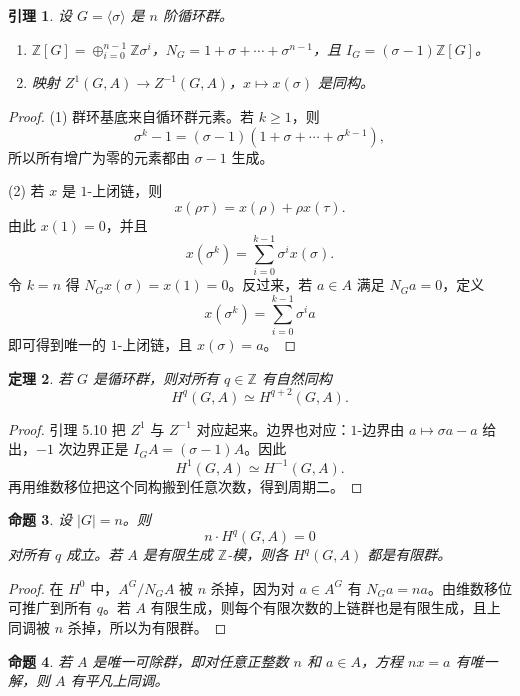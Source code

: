 \documentclass[11pt,a4paper,openany]{ctexbook}
\numberwithin{equation}{chapter}
\newcommand{\Z}{\mathbb{Z}}
\theoremstyle{plain}
\newtheorem{theorem}{定理}[chapter]
\newtheorem{proposition}[theorem]{命题}
\newtheorem{lemma}[theorem]{引理}
\theoremstyle{definition}
\theoremstyle{remark}
\begin{document}
\begin{lemma}
设 $G=\langle\sigma\rangle$ 是 $n$ 阶循环群。
\begin{enumerate}[label=(\arabic*)]
\item $\Z[G]=\oplus_{i=0}^{n-1}\Z\sigma^i$，$N_G=1+\sigma+\cdots+\sigma^{n-1}$，且 $I_G=(\sigma-1)\Z[G]$。
\item 映射 $Z^1(G,A)\to Z^{-1}(G,A)$，$x\mapsto x(\sigma)$ 是同构。
\end{enumerate}
\end{lemma}

\begin{proof}
(1) 群环基底来自循环群元素。若 $k\ge1$，则
\[
 \sigma^k-1=(\sigma-1)(1+\sigma+\cdots+\sigma^{k-1}),
\]
所以所有增广为零的元素都由 $\sigma-1$ 生成。

(2) 若 $x$ 是 $1$-上闭链，则
\[
 x(\rho\tau)=x(\rho)+\rho x(\tau).
\]
由此 $x(1)=0$，并且
\[
 x(\sigma^k)=\sum_{i=0}^{k-1}\sigma^ix(\sigma).
\]
令 $k=n$ 得 $N_Gx(\sigma)=x(1)=0$。反过来，若 $a\in A$ 满足 $N_Ga=0$，定义
\[
 x(\sigma^k)=\sum_{i=0}^{k-1}\sigma^ia
\]
即可得到唯一的 $1$-上闭链，且 $x(\sigma)=a$。
\end{proof}

\begin{theorem}
若 $G$ 是循环群，则对所有 $q\in\Z$ 有自然同构
\[
 H^q(G,A)\simeq H^{q+2}(G,A).
\]
\end{theorem}

\begin{proof}
引理 5.10 把 $Z^1$ 与 $Z^{-1}$ 对应起来。边界也对应：$1$-边界由 $a\mapsto \sigma a-a$ 给出，$-1$ 次边界正是 $I_GA=(\sigma-1)A$。因此
\[
 H^1(G,A)\simeq H^{-1}(G,A).
\]
再用维数移位把这个同构搬到任意次数，得到周期二。
\end{proof}

\begin{proposition}
设 $|G|=n$。则
\[
 n\cdot H^q(G,A)=0
\]
对所有 $q$ 成立。若 $A$ 是有限生成 $\Z$-模，则各 $H^q(G,A)$ 都是有限群。
\end{proposition}

\begin{proof}
在 $H^0$ 中，$A^G/N_GA$ 被 $n$ 杀掉，因为对 $a\in A^G$ 有 $N_Ga=na$。由维数移位可推广到所有 $q$。若 $A$ 有限生成，则每个有限次数的上链群也是有限生成，且上同调被 $n$ 杀掉，所以为有限群。
\end{proof}

\begin{proposition}
若 $A$ 是唯一可除群，即对任意正整数 $n$ 和 $a\in A$，方程 $nx=a$ 有唯一解，则 $A$ 有平凡上同调。
\end{proposition}
\end{document}
